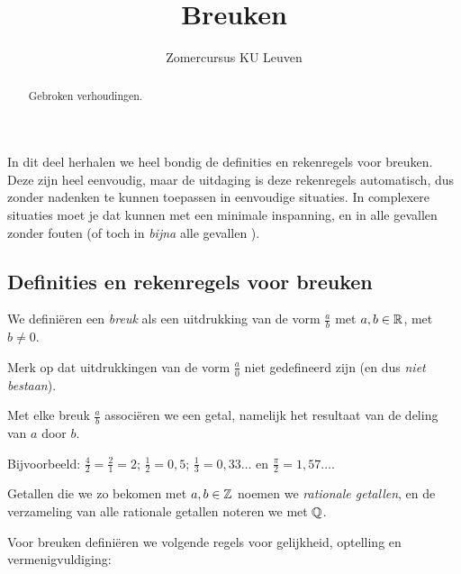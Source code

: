 \documentclass[numbers]{ximera}
\author{Zomercursus KU Leuven}
\title[Rekenvaardigheden:]{Breuken}
\begin{document}
\begin{abstract}
	Gebroken verhoudingen.
\end{abstract}
\maketitle

In dit deel herhalen we heel bondig de definities en rekenregels voor
breuken. Deze zijn heel eenvoudig, maar de uitdaging is deze rekenregels automatisch, dus zonder nadenken te kunnen toepassen in eenvoudige situaties. In complexere situaties moet je dat kunnen met een minimale inspanning, en in alle gevallen zonder fouten (of toch in \textit{bijna} alle gevallen \Smiley).

\subsection{Definities en rekenregels voor breuken}
We definiëren een \textit{breuk} als een uitdrukking van de vorm $\frac{a}{b}$ met $a,b\in\mathbb{R}$, met $b\neq0$. 


Merk op dat uitdrukkingen van de vorm $\frac a0$ niet gedefineerd zijn (en dus \textit{niet bestaan}).  

Met elke breuk $\frac ab$ associëren we een getal, namelijk het resultaat van de deling van $a$ door $b$.

Bijvoorbeeld: $\frac42=\frac21=2$; \quad $\frac12=0,5$; \quad $\frac13=0,33\dots$ en $\frac{\pi}{2}=1,57\dots$. 

Getallen die we zo bekomen met $a,b\in\mathbb{Z}$ noemen we \textit{rationale getallen}, en de verzameling van alle rationale getallen noteren we met $\mathbb{Q}$.


Voor breuken definiëren we volgende regels voor gelijkheid, optelling en vermenigvuldiging: 
\end{document}
